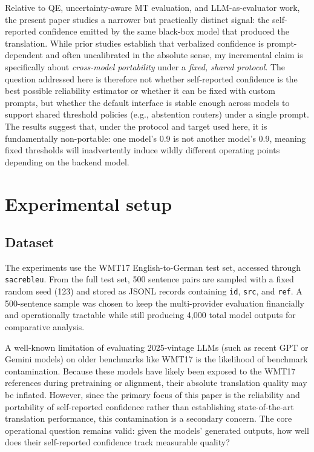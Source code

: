 \documentclass[10pt,conference]{IEEEtran}
\begin{document}
Relative to QE, uncertainty-aware MT evaluation, and LLM-as-evaluator work, the present paper studies a narrower but practically distinct signal: the self-reported confidence emitted by the same black-box model that produced the translation. While prior studies establish that verbalized confidence is prompt-dependent and often uncalibrated in the absolute sense, my incremental claim is specifically about \emph{cross-model portability} under a \emph{fixed, shared protocol}. The question addressed here is therefore not whether self-reported confidence is the best possible reliability estimator or whether it can be fixed with custom prompts, but whether the default interface is stable enough across models to support shared threshold policies (e.g., abstention routers) under a single prompt. The results suggest that, under the protocol and target used here, it is fundamentally non-portable: one model's 0.9 is not another model's 0.9, meaning fixed thresholds will inadvertently induce wildly different operating points depending on the backend model.

\section{Experimental setup}

\subsection{Dataset}
The experiments use the WMT17 English-to-German test set, accessed through \texttt{sacrebleu}. From the full test set, 500 sentence pairs are sampled with a fixed random seed (123) and stored as JSONL records containing \texttt{id}, \texttt{src}, and \texttt{ref}. A 500-sentence sample was chosen to keep the multi-provider evaluation financially and operationally tractable while still producing 4,000 total model outputs for comparative analysis.

A well-known limitation of evaluating 2025-vintage LLMs (such as recent GPT or Gemini models) on older benchmarks like WMT17 is the likelihood of benchmark contamination. Because these models have likely been exposed to the WMT17 references during pretraining or alignment, their absolute translation quality may be inflated. However, since the primary focus of this paper is the reliability and portability of self-reported confidence rather than establishing state-of-the-art translation performance, this contamination is a secondary concern. The core operational question remains valid: given the models' generated outputs, how well does their self-reported confidence track measurable quality?
\end{document}
